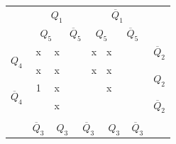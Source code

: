 \documentclass[a4paper,14pt]{article}
\begin{document}
\begin{table}[H]
	\begin{minipage}{.5\linewidth}
		\centering
\begin{tabular}{cccccccccc}
	& \multicolumn{4}{c}{$Q_1$}                                                                       & \multicolumn{4}{c}{$\overline{Q}_1$}                                                            &                        \\
	& \multicolumn{2}{c}{$Q_5$}                       & \multicolumn{2}{c}{$\overline{Q}_5$}          & \multicolumn{2}{c}{$Q_5$}                       & \multicolumn{2}{c}{$\overline{Q}_5$}          &                        \\ \cline{2-9}
	\multicolumn{1}{c|}{\multirow{2}{*}{$Q_4$}}            & \multicolumn{1}{c|}{x} & \multicolumn{1}{c|}{x} & \multicolumn{1}{c|}{} & \multicolumn{1}{c|}{} & \multicolumn{1}{c|}{x} & \multicolumn{1}{c|}{x} & \multicolumn{1}{c|}{} & \multicolumn{1}{c|}{} & $\overline{Q}_2$       \\ \cline{2-9}
	\multicolumn{1}{c|}{}                                  & \multicolumn{1}{c|}{x} & \multicolumn{1}{c|}{x} & \multicolumn{1}{c|}{} & \multicolumn{1}{c|}{} & \multicolumn{1}{c|}{x} & \multicolumn{1}{c|}{x} & \multicolumn{1}{c|}{} & \multicolumn{1}{c|}{} & \multirow{2}{*}{$Q_2$} \\ \cline{2-9}
	\multicolumn{1}{c|}{\multirow{2}{*}{$\overline{Q}_4$}} & \multicolumn{1}{c|}{1} & \multicolumn{1}{c|}{x} & \multicolumn{1}{c|}{} & \multicolumn{1}{c|}{} & \multicolumn{1}{c|}{}  & \multicolumn{1}{c|}{x} & \multicolumn{1}{c|}{} & \multicolumn{1}{c|}{} &                        \\ \cline{2-9}
	\multicolumn{1}{c|}{}                                  & \multicolumn{1}{c|}{}  & \multicolumn{1}{c|}{x} & \multicolumn{1}{c|}{} & \multicolumn{1}{c|}{} & \multicolumn{1}{c|}{}  & \multicolumn{1}{c|}{}  & \multicolumn{1}{c|}{} & \multicolumn{1}{c|}{} & $\overline{Q}_2$       \\ \cline{2-9}
	&                        & \multicolumn{2}{c}{}                           & \multicolumn{2}{c}{}                           & \multicolumn{2}{c}{}                           &                       &                        \\
	& $\overline{Q}_3$       & \multicolumn{2}{c}{$Q_3$}                      & \multicolumn{2}{c}{$\overline{Q}_3$}           & \multicolumn{2}{c}{$Q_3$}                      & $\overline{Q}_3$      &                       

\end{tabular}
\end{minipage}
\end{table}
\end{document}
